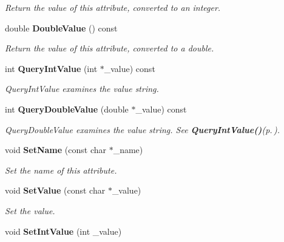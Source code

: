\begin{CompactItemize}
\begin{CompactList}\small\item\em Return the value of this attribute, converted to an integer. \item\end{CompactList}\item 
double {\bf Double\-Value} () const\label{classTiXmlAttribute_TiXmlAttributea6}

\begin{CompactList}\small\item\em Return the value of this attribute, converted to a double. \item\end{CompactList}\item 
int {\bf Query\-Int\-Value} (int $\ast$\_\-value) const
\begin{CompactList}\small\item\em Query\-Int\-Value examines the value string. \item\end{CompactList}\item 
int {\bf Query\-Double\-Value} (double $\ast$\_\-value) const\label{classTiXmlAttribute_TiXmlAttributea8}

\begin{CompactList}\small\item\em Query\-Double\-Value examines the value string. See {\bf Query\-Int\-Value()}{\rm (p.\,\pageref{classTiXmlAttribute_TiXmlAttributea7})}. \item\end{CompactList}\item 
void {\bf Set\-Name} (const char $\ast$\_\-name)\label{classTiXmlAttribute_TiXmlAttributea9}

\begin{CompactList}\small\item\em Set the name of this attribute. \item\end{CompactList}\item 
void {\bf Set\-Value} (const char $\ast$\_\-value)\label{classTiXmlAttribute_TiXmlAttributea10}

\begin{CompactList}\small\item\em Set the value. \item\end{CompactList}\item 
void {\bf Set\-Int\-Value} (int \_\-value)\label{classTiXmlAttribute_TiXmlAttributea11}


\end{CompactItemize}
